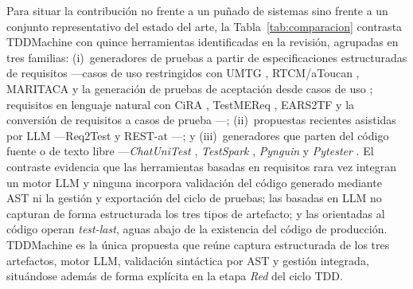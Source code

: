 \documentclass[10pt,journal,twoside,letterpaper]{IEEEtran}
\begin{document}
	Para situar la contribución no frente a un puñado de sistemas sino frente a un conjunto representativo del estado del arte, la Tabla~\ref{tab:comparacion} contrasta TDDMachine con quince herramientas identificadas en la revisión, agrupadas en tres familias: (i)~generadores de pruebas a partir de especificaciones estructuradas de requisitos ---casos de uso restringidos con UMTG \cite{p099}, RTCM/aToucan \cite{p066}, MARITACA \cite{p094} y la generación de pruebas de aceptación desde casos de uso \cite{p090}; requisitos en lenguaje natural con CiRA \cite{p035}, TestMEReq \cite{p080}, EARS2TF \cite{p040} y la conversión de requisitos a casos de prueba \cite{p007}---; (ii)~propuestas recientes asistidas por LLM ---Req2Test \cite{p067} y REST-at \cite{p065}---; y (iii)~generadores que parten del código fuente o de texto libre ---\emph{ChatUniTest} \cite{chen2024chatunitest}, \emph{TestSpark} \cite{sapozhnikov2024testspark}, \emph{Pynguin} \cite{lukasczyk2022pynguin} y \emph{Pytester} \cite{takerngsaksiri2025pytester}. El contraste evidencia que las herramientas basadas en requisitos rara vez integran un motor LLM y ninguna incorpora validación del código generado mediante AST ni la gestión y exportación del ciclo de pruebas; las basadas en LLM no capturan de forma estructurada los tres tipos de artefacto; y las orientadas al código operan \emph{test-last}, aguas abajo de la existencia del código de producción. TDDMachine es la única propuesta que reúne captura estructurada de los tres artefactos, motor LLM, validación sintáctica por AST y gestión integrada, situándose además de forma explícita en la etapa \emph{Red} del ciclo TDD.
	
\end{document}
